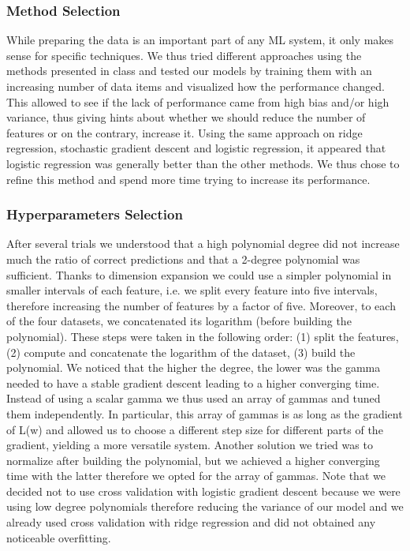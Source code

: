 \documentclass[10pt,conference,compsocconf]{IEEEtran}
\begin{document}
\subsubsection{Method Selection}
While preparing the data is an important part of any ML system, it only makes sense for specific techniques. 
We thus tried different approaches using the methods presented in class and tested our models by training them with an increasing number of data items and visualized how the performance changed. This allowed to see if the lack of performance came from high bias and/or high variance, thus giving hints about whether we should reduce the number of features or on the contrary, increase it. 
Using the same approach on ridge regression, stochastic gradient descent and logistic regression, it appeared that logistic regression was generally better than the other methods. We thus chose to refine this method and spend more time trying to increase its performance. 

\subsubsection{Hyperparameters Selection}
After several trials we understood that a high polynomial degree did not increase much the ratio of correct predictions and that a 2-degree polynomial was sufficient. Thanks to dimension expansion we could use a simpler polynomial in smaller intervals of each feature, i.e. we split every feature into five intervals, therefore increasing the number of features by a factor of five. Moreover, to each of the four datasets, we concatenated its logarithm (before building the polynomial). These steps were taken in the following order: (1) split the features, (2) compute and concatenate the logarithm of the dataset, (3) build the polynomial.  
We noticed that the higher the degree, the lower was the gamma needed to have a stable gradient descent leading to a higher converging time. Instead of using a scalar gamma we thus used an array of gammas and tuned them independently. In particular, this array of gammas is as long as the gradient of L(w) and allowed us to choose a different step size for different parts of the gradient, yielding a more versatile system. Another solution we tried was to normalize after building the polynomial, but we achieved a higher converging time with the latter therefore we opted for the array of gammas. Note that we decided not to use cross validation with logistic gradient descent because we were using low degree polynomials therefore reducing the variance of our model and we already used cross validation with ridge regression and did not obtained any noticeable overfitting.
\end{document}
